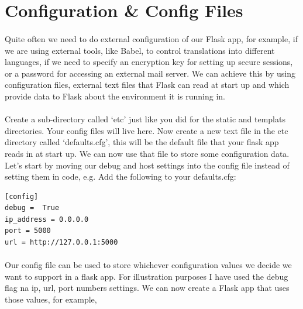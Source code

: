\documentclass[12pt, a4paper, twoside]{book}
\begin{document}
\section{Configuration \& Config Files}
\label{configs}
\paragraph{} Quite often we need to do external configuration of our Flask app, for example, if we are using external tools, like Babel, to control translations into different languages, if we need to specify an encryption key for setting up secure sessions, or a password for accessing an external mail server. We can achieve this by using configuration files, external text files that Flask can read at start up and which provide data to Flask about the environment it is running in.

\paragraph{} Create a sub-directory called `etc' just like you did for the static and templats directories. Your config files will live here. Now create a new text file in the etc directory called `defaults.cfg', this will be the default file that your flask app reads in at start up. We can now use that file to store some configuration data. Let's start by moving our debug and host settings into the config file instead of setting them in code, e.g. Add the following to your defaults.cfg:

\begin{lstlisting}
[config]
debug =  True
ip_address = 0.0.0.0
port = 5000
url = http://127.0.0.1:5000
\end{lstlisting}

\paragraph{} Our config file can be used to store whichever configuration values we decide we want to support in a flask app. For illustration purposes I have used the debug flag na ip, url, port numbers settings. We can now create a Flask app that uses those values, for example,
\end{document}

